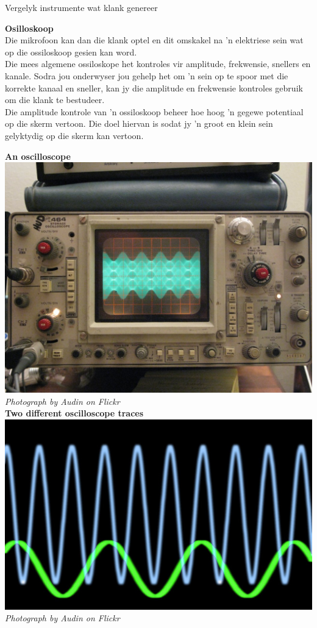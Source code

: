 \begin{activity}{Vergelyk instrumente wat klank genereer}
\begin{minipage}{.5\textwidth}

\textbf{Osilloskoop} \\
Die mikrofoon kan dan die klank optel en dit omskakel na  'n elektriese sein wat op die ossiloskoop gesien kan word.\\

Die mees algemene ossiloskope het kontroles vir amplitude, frekwensie, snellers en kanale. Sodra jou onderwyser jou gehelp het om  'n sein op te spoor met die korrekte kanaal en sneller, kan jy die amplitude en frekwensie kontroles gebruik om die klank te bestudeer.\\

Die amplitude kontrole van  'n ossiloskoop beheer hoe hoog  'n gegewe potentiaal op die skerm vertoon. Die doel hiervan is sodat jy  'n groot en klein sein gelyktydig op die skerm kan vertoon. \\

\end{minipage}
\begin{minipage}{.5\textwidth}
\begin{center}
\textbf{An oscilloscope}\\
\includegraphics[width=.8\textwidth]{../Grade10/photos/oscilloscope_Audin_Flickr.jpg}\\
\textsl{Photograph by Audin on Flickr}\\
\textbf{Two different oscilloscope traces}\\
\includegraphics[width=.8\textwidth]{../Grade10/photos/oscilloscopetrace_Creativity103_Flickr.jpg}\\
\textsl{Photograph by Audin on Flickr}\\
\end{center}
\end{minipage}


\end{activity}
